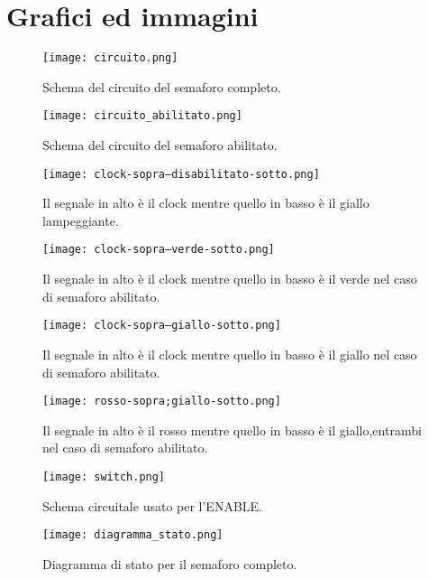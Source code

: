 \section{Grafici ed immagini}

\begin{figure}[h]
	\centering
	\texttt{[image: circuito.png]}
	\caption{Schema del circuito del semaforo completo.}
	\label{f:circuito_completo}
\end{figure}

\begin{figure}[h]
	\centering
	\texttt{[image: circuito\_abilitato.png]}
	\caption{Schema del circuito del semaforo abilitato.}
	\label{f:semaforo_abilitato}
\end{figure}

\begin{figure}[h]
	\centering
	\texttt{[image: clock-sopra--disabilitato-sotto.png]}
	\caption{Il segnale in alto è il clock mentre quello in basso è il giallo lampeggiante.}
	\label{f:lampeggiante}
\end{figure}

\begin{figure}[h]
	\centering
	\texttt{[image: clock-sopra--verde-sotto.png]}
	\caption{Il segnale in alto è il clock mentre quello in basso è il verde nel caso di semaforo abilitato.}
	\label{f:verde}
\end{figure}

\begin{figure}[h]
	\centering
	\texttt{[image: clock-sopra--giallo-sotto.png]}
	\caption{Il segnale in alto è il clock mentre quello in basso è il giallo nel caso di semaforo abilitato.}
	\label{f:giallo}
\end{figure}

\begin{figure}[h]
	\centering
	\texttt{[image: rosso-sopra;giallo-sotto.png]}
	\caption{Il segnale in alto è il rosso mentre quello in basso è il giallo,entrambi nel caso di semaforo abilitato.}
	\label{f:rosso}
\end{figure}

\begin{figure}[h]
	\centering
	\texttt{[image: switch.png]}
	\caption{Schema circuitale usato per l'ENABLE.}
	\label{f:enable}
\end{figure}

\begin{figure}[h]
	\centering
	\texttt{[image: diagramma\_stato.png]}
	\caption{Diagramma di stato per il semaforo completo.}
	\label{f:diagramma}
\end{figure}